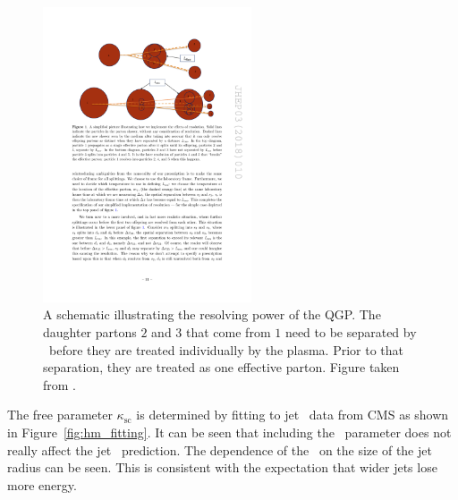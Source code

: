 
\begin{figure}[htbp]
\begin{center}
\includegraphics[width=0.55\textwidth]{figures/jetMeasurements/HM_lres}
\caption{A schematic illustrating the resolving power of the QGP.
The daughter partons $2$ and $3$ that come from $1$ need to be separated by \Lres\ before they are treated individually by the plasma.
Prior to that separation, they are treated as one effective parton.
Figure taken from \cite{Hulcher:2017cpt}.}
\label{fig:hm_lres}
\end{center}
\end{figure}


The free parameter $\kappa_\mathrm{sc}$ is determined by fitting to jet \RAA\ data from CMS \cite{Khachatryan:2016jfl} as shown in Figure~\ref{fig:hm_fitting}.
It can be seen that including the \Lres\ parameter does not really affect the jet \RAA\ prediction.
The dependence of the \RAA\ on the size of the jet radius can be seen.
This is consistent with the expectation that wider jets lose more energy.

